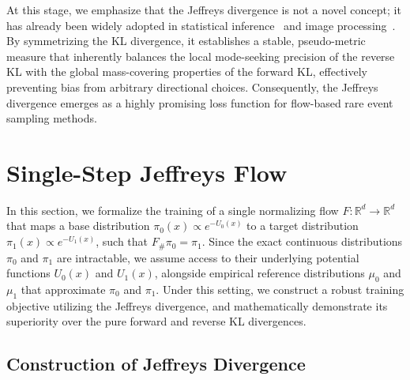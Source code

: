 \documentclass[%
 reprint,
 amsmath,amssymb,
 aps,
 pre,
]{revtex4-2}
\begin{document}
At this stage, we emphasize that the Jeffreys divergence is not a novel concept; it has already been widely adopted in statistical inference~\cite{moreno2003kullback, bayarri2008generalization, yao2011symmetric, sharma2021clustering} and image processing~\cite{nishii2006image, han2020active}. By symmetrizing the KL divergence, it establishes a stable, pseudo-metric measure that inherently balances the local mode-seeking precision of the reverse KL with the global mass-covering properties of the forward KL, effectively preventing bias from arbitrary directional choices. Consequently, the Jeffreys divergence emerges as a highly promising loss function for flow-based rare event sampling methods.

\section{Single-Step Jeffreys Flow}

In this section, we formalize the training of a single normalizing flow $F:\mathbb{R}^d \to \mathbb{R}^d$ that maps a base distribution $\pi_0(x) \propto e^{-U_0(x)}$ to a target distribution $\pi_1(x) \propto e^{-U_1(x)}$, such that $F_{\#} \pi_0 = \pi_1$. Since the exact continuous distributions $\pi_0$ and $\pi_1$ are intractable, we assume access to their underlying potential functions $U_0(x)$ and $U_1(x)$, alongside empirical reference distributions $\mu_0$ and $\mu_1$ that approximate $\pi_0$ and $\pi_1$. Under this setting, we construct a robust training objective utilizing the Jeffreys divergence, and mathematically demonstrate its superiority over the pure forward and reverse KL divergences.

\subsection{Construction of Jeffreys Divergence}
\end{document}
